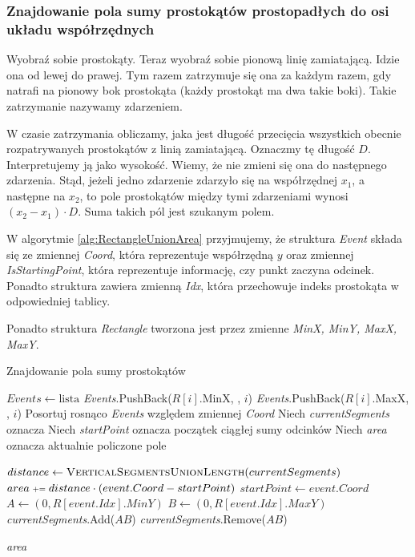 \subsubsection{Znajdowanie pola sumy prostokątów prostopadłych do osi układu współrzędnych}
Wyobraź sobie prostokąty. Teraz wyobraź sobie pionową linię zamiatającą. Idzie ona od lewej do prawej. Tym
razem zatrzymuje się ona za każdym razem, gdy natrafi na pionowy bok prostokąta (każdy prostokąt ma dwa takie
boki). Takie zatrzymanie nazywamy zdarzeniem. 

W czasie zatrzymania obliczamy, jaka jest długość przecięcia wszystkich obecnie rozpatrywanych 
prostokątów z linią zamiatającą. Oznaczmy tę długość $D$. Interpretujemy ją jako wysokość. Wiemy, 
że nie zmieni się ona do następnego zdarzenia. Stąd, jeżeli jedno zdarzenie zdarzyło się na współrzędnej $x_1$,
a następne na $x_2$, to pole prostokątów między tymi zdarzeniami wynosi $(x_2-x_1)\cdot D$. Suma takich pól jest szukanym polem.

W algorytmie \ref{alg:RectangleUnionArea} przyjmujemy, że
struktura \textit{Event} składa się ze zmiennej \textit{Coord}, która reprezentuje
współrzędną $y$ oraz zmiennej \textit{IsStartingPoint}, która 
reprezentuje informację, czy punkt zaczyna odcinek. Ponadto 
struktura zawiera zmienną \textit{Idx}, która przechowuje
indeks prostokąta w odpowiedniej tablicy.

Ponadto struktura \textit{Rectangle} tworzona jest przez zmienne \textit{MinX, MinY, MaxX, MaxY}.

\begin{algorithm}[H]
	\caption{Znajdowanie pola sumy prostokątów}
	\begin{algorithmic}[1]
		\State $Events \gets \text{lista}$
		\State \textit{Events}.PushBack($R[i]$.MinX, \true, $i$)
		\State \textit{Events}.PushBack($R[i]$.MaxX, \false, $i$)
		\EndFor
		\State Posortuj rosnąco \textit{Events }względem zmiennej \textit{Coord}
		\State Niech \textit{currentSegments} oznacza %
		\State Niech \textit{startPoint} oznacza początek ciągłej sumy odcinków
		\State Niech \textit{area} oznacza aktualnie policzone pole
		
		\State $distance \gets \textsc{VerticalSegmentsUnionLength}(currentSegments)$
		\State $area \pleq distance \cdot (event.Coord - startPoint)$
		\EndIf
		\State $startPoint \gets event.Coord$
		\State $A \gets (0, R[event.Idx].MinY)$
		\State $B \gets (0, R[event.Idx].MaxY)$
		\State \textit{currentSegments}.Add($AB$)
		\Else
		\State \textit{currentSegments}.Remove($AB$)
		\EndIf
		\EndFor
		
		\State \Return \textit{area}
		\EndProcedure
	\end{algorithmic}
	\label{alg:RectangleUnionArea}
\end{algorithm}

